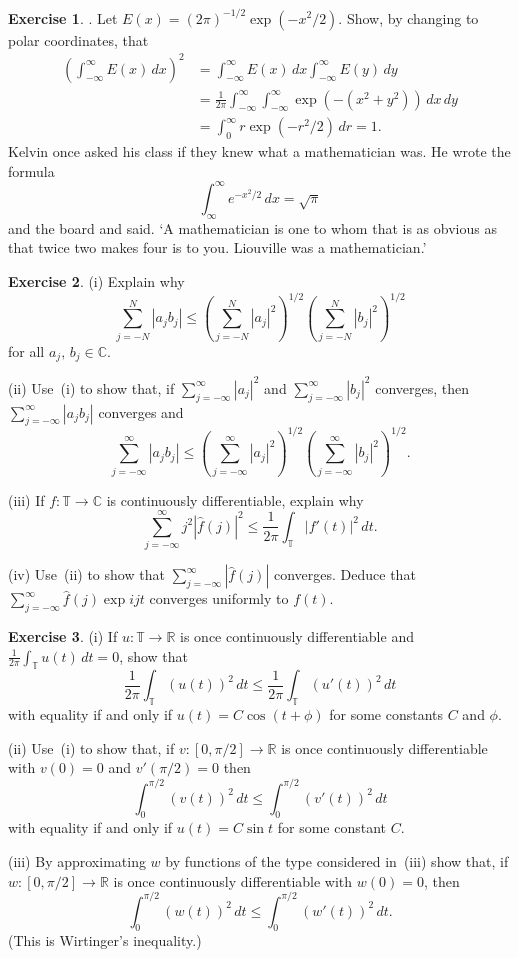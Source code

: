 \documentclass[12pt]{article}
\theoremstyle{definition}
\newtheorem{question}{Exercise}[section]
\begin{document}
\begin{question}\label{E, Liouville}.
Let $E(x)=(2\pi)^{-1/2}\exp(-x^{2}/2)$.
Show, by changing to polar coordinates, that
\begin{align*}
\left(\int_{-\infty}^{\infty}E(x)\,dx\right)^{2}
&=\int_{-\infty}^{\infty}E(x)\,dx\int_{-\infty}^{\infty}E(y)\,dy\\
&=\frac{1}{2\pi}\int_{-\infty}^{\infty}\int_{-\infty}^{\infty}
\exp(-(x^{2}+y^{2}))\,dx\,dy\\
&=\int_{0}^{\infty}r\exp(-r^{2}/2)\,dr=1.
\end{align*}
Kelvin once asked his class if they knew what a mathematician was.
He wrote the formula
\[\int_{\infty}^{\infty}e^{-x^{2}/2}\,dx=\sqrt{\pi}\]
and the board and said. 
`A mathematician is one to whom that 
is as obvious as that twice two makes four is to you. 
Liouville was a mathematician.'
\end{question}
\begin{question}\label{E, differentiable everywhere}
(i) Explain why
\[\sum_{j=-N}^{N}|a_{j}b_{j}|\leq 
\left(\sum_{j=-N}^{N}|a_{j}|^{2}\right)^{1/2} 
\left(\sum_{j=-N}^{N}|b_{j}|^{2}\right)^{1/2}\]
for all $a_{j},\,b_{j}\in{\mathbb C}$.

(ii) Use~(i) to show that, if
$\sum_{j=-\infty}^{\infty}|a_{j}|^{2}$ and
$\sum_{j=-\infty}^{\infty}|b_{j}|^{2}$ converges, then
$\sum_{j=-\infty}^{\infty}|a_{j}b_{j}|$ converges and
\[\sum_{j=-\infty}^{\infty}|a_{j}b_{j}|\leq 
\left(\sum_{j=-\infty}^{\infty}|a_{j}|^{2}\right)^{1/2}
\left(\sum_{j=-\infty}^{\infty}|b_{j}|^{2}\right)^{1/2}.\]

(iii) If $f:{\mathbb T}\rightarrow{\mathbb C}$ is continuously 
differentiable, explain why
\[\sum_{j=-\infty}^{\infty}j^{2}|\hat{f}(j)|^{2}
\leq \frac{1}{2\pi}\int_{\mathbb T}|f'(t)|^{2}\,dt.\]

(iv) Use~(ii)
to show that $\sum_{j=-\infty}^{\infty}|\hat{f}(j)|$ converges.
Deduce that $\sum_{j=-\infty}^{\infty}\hat{f}(j)\exp ijt$
converges uniformly to $f(t)$.
\end{question}
\begin{question} (i) If $u:{\mathbb T}\rightarrow{\mathbb R}$
is once continuously differentiable and
$\frac{1}{2\pi}\int_{\mathbb T}u(t)\,dt=0$, show that
\[\frac{1}{2\pi}\int_{\mathbb T}(u(t))^{2}\,dt
\leq \frac{1}{2\pi}\int_{\mathbb T}(u'(t))^{2}\,dt\]
with equality if and only if
$u(t)=C\cos(t+\phi)$ for some constants $C$ and $\phi$.

(ii) Use~(i) to show that, if $v:[0,\pi/2]\rightarrow{\mathbb R}$
is once continuously differentiable with $v(0)=0$ and
$v'(\pi/2)=0$ then
\[\int_{0}^{\pi/2}(v(t))^{2}\,dt
\leq  \int_{0}^{\pi/2}(v'(t))^{2}\,dt\]
with equality if and only if
$u(t)=C\sin t$ for some constant $C$.

(iii) By approximating $w$ by functions of the type considered
in~(iii) show that, if $w:[0,\pi/2]\rightarrow{\mathbb R}$
is once continuously differentiable with $w(0)=0$, then
\[\int_{0}^{\pi/2}(w(t))^{2}\,dt
\leq  \int_{0}^{\pi/2}(w'(t))^{2}\,dt.\]
(This is Wirtinger's inequality.)
\end{question}
\end{document}

